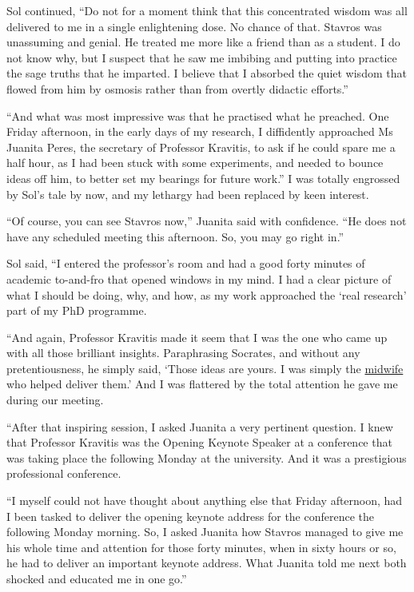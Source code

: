 \documentclass[
  a4paper,
]{article}
\begin{document}
Sol continued, ``Do not for a moment think that this concentrated wisdom
was all delivered to me in a single enlightening dose. No chance of
that. Stavros was unassuming and genial. He treated me more like a
friend than as a student. I do not know why, but I suspect that he saw
me imbibing and putting into practice the sage truths that he imparted.
I believe that I absorbed the quiet wisdom that flowed from him by
osmosis rather than from overtly didactic efforts.''

``And what was most impressive was that he practised what he preached.
One Friday afternoon, in the early days of my research, I diffidently
approached Ms Juanita Peres, the secretary of Professor Kravitis, to ask
if he could spare me a half hour, as I had been stuck with some
experiments, and needed to bounce ideas off him, to better set my
bearings for future work.'' I was totally engrossed by Sol's tale by
now, and my lethargy had been replaced by keen interest.

``Of course, you can see Stavros now,'' Juanita said with confidence.
``He does not have any scheduled meeting this afternoon. So, you may go
right in.''

Sol said, ``I entered the professor's room and had a good forty minutes
of academic to-and-fro that opened windows in my mind. I had a clear
picture of what I should be doing, why, and how, as my work approached
the `real research' part of my PhD programme.

``And again, Professor Kravitis made it seem that I was the one who came
up with all those brilliant insights. Paraphrasing Socrates, and without
any pretentiousness, he simply said, `Those ideas are yours. I was
simply the
\href{https://philosophycourse.info/lecsite/lec-socmidwife.html}{midwife}
who helped deliver them.' And I was flattered by the total attention he
gave me during our meeting.

``After that inspiring session, I asked Juanita a very pertinent
question. I knew that Professor Kravitis was the Opening Keynote Speaker
at a conference that was taking place the following Monday at the
university. And it was a prestigious professional conference.

``I myself could not have thought about anything else that Friday
afternoon, had I been tasked to deliver the opening keynote address for
the conference the following Monday morning. So, I asked Juanita how
Stavros managed to give me his whole time and attention for those forty
minutes, when in sixty hours or so, he had to deliver an important
keynote address. What Juanita told me next both shocked and educated me
in one go.''
\end{document}
